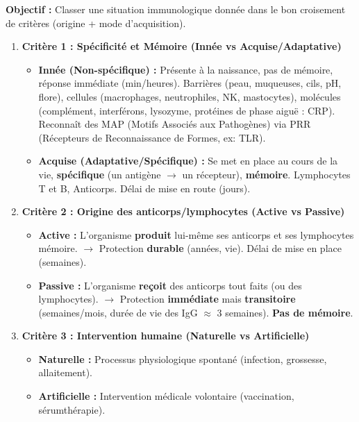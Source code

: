 \documentclass[11pt]{article}
\newcommand{\cle}[1]{{\popxbold\color{popdark}#1}}
\begin{document}
\begin{methode}
    \textbf{Objectif :} Classer une situation immunologique donnée dans le bon croisement de critères (origine + mode d'acquisition).
    \begin{enumerate}
        \item \textbf{Critère 1 : Spécificité et Mémoire (Innée vs Acquise/Adaptative)}
        \begin{itemize}
            \item \textbf{Innée (Non-spécifique) :} Présente à la naissance, pas de mémoire, réponse immédiate (min/heures). Barrières (peau, muqueuses, cils, pH, flore), cellules (macrophages, neutrophiles, NK, mastocytes), molécules (complément, interférons, lysozyme, protéines de phase aiguë : CRP). Reconnaît des \cle{MAP} (Motifs Associés aux Pathogènes) via \cle{PRR} (Récepteurs de Reconnaissance de Formes, ex: TLR).
            \item \textbf{Acquise (Adaptative/Spécifique) :} Se met en place au cours de la vie, \textbf{spécifique} (un antigène $\rightarrow$ un récepteur), \textbf{mémoire}. Lymphocytes T et B, Anticorps. Délai de mise en route (jours).
        \end{itemize}
        \item \textbf{Critère 2 : Origine des anticorps/lymphocytes (Active vs Passive)}
        \begin{itemize}
            \item \textbf{Active :} L'organisme \textbf{produit} lui-même ses anticorps et ses lymphocytes mémoire. $\rightarrow$ Protection \textbf{durable} (années, vie). Délai de mise en place (semaines).
            \item \textbf{Passive :} L'organisme \textbf{reçoit} des anticorps tout faits (ou des lymphocytes). $\rightarrow$ Protection \textbf{immédiate} mais \textbf{transitoire} (semaines/mois, durée de vie des IgG $\approx$ 3 semaines). \textbf{Pas de mémoire}.
        \end{itemize}
        \item \textbf{Critère 3 : Intervention humaine (Naturelle vs Artificielle)}
        \begin{itemize}
            \item \textbf{Naturelle :} Processus physiologique spontané (infection, grossesse, allaitement).
            \item \textbf{Artificielle :} Intervention médicale volontaire (vaccination, sérumthérapie).

\end{itemize}
\end{enumerate}
\end{methode}
\end{document}
